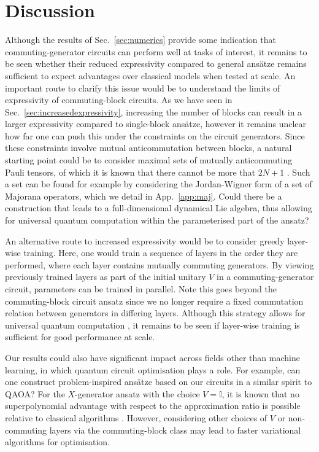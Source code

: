 \documentclass[a4paper,twocolumn,11pt]{quantumarticle}
\begin{document}
\section{Discussion}
Although the results of Sec.\ \ref{sec:numerics} provide some indication that commuting-generator circuits can perform well at tasks of interest, it remains to be seen whether their reduced expressivity compared to general ans\"{a}tze remains sufficient to expect advantages over classical models when tested at scale. An important route to clarify this issue would be to understand the limits of expressivity of commuting-block circuits. As we have seen in Sec.\ \ref{sec:increasedexpressivity}, increasing the number of blocks can result in a larger expressivity compared to single-block ans\"{a}tze, however it remains unclear how far one can push this under the constraints on the circuit generators. Since these constraints involve mutual anticommutation between blocks, a natural starting point could be to consider maximal sets of mutually anticommuting Pauli tensors, of which it is known that there cannot be more that $2N+1$ \cite{sarkar2021sets}. Such a set can be found for example by considering the Jordan-Wigner form of a set of Majorana operators, which we detail in App.\ \ref{app:maj}. Could there be a construction that leads to a full-dimensional dynamical Lie algebra, thus allowing for universal quantum computation within the parameterised part of the ansatz? 

An alternative route to increased expressivity would be to consider greedy layer-wise training. Here, one would train a sequence of layers in the order they are performed, where each layer contains mutually commuting generators. By viewing previously trained layers as part of the initial unitary $V$ in a commuting-generator circuit, parameters can be trained in parallel. Note this goes beyond the commuting-block circuit ansatz since we no longer require a fixed commutation relation between generators in differing layers. Although this strategy allows for universal quantum computation \cite{lloyd2018quantum}, it remains to be seen if layer-wise training is sufficient for good performance at scale. 

Our results could also have significant impact across fields other than machine learning, in which quantum circuit optimisation plays a role. For example, can one construct problem-inspired ans\"{a}tze based on our circuits in a similar spirit to QAOA? For the $X$-generator ansatz with the choice $V=\mathbb{I}$, it is known that no superpolynomial advantage with respect to the approximation ratio is possible relative to classical algorithms \cite{lee2021progress}. However, considering other choices of $V$ or non-commuting layers via the commuting-block class may lead to faster variational algorithms for optimisation. 
\end{document}
